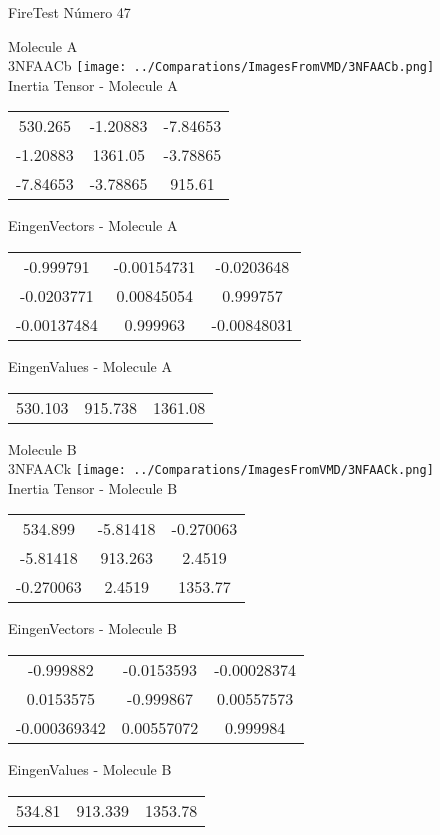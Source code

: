 \vtab[-2cm]
\begin{center}
{\large FireTest \tab Número 47}
\end{center}
\begin{multicols}{2}
\begin{center}

Molecule A \\ 
3NFAACb
\texttt{[image: ../Comparations/ImagesFromVMD/3NFAACb.png]}
\\
Inertia Tensor - Molecule A \\
\vtab

\begin{tabular}{|c c c|}
530.265	 & 	-1.20883	 & 	-7.84653	 \\
-1.20883	 & 	1361.05	 & 	-3.78865	 \\
-7.84653	 & 	-3.78865	 & 	915.61
\end{tabular}

\vtab
 EingenVectors - Molecule A     \\
\vtab
\begin{tabular}{|c c c|}
-0.999791	 & 	-0.00154731	 & 	-0.0203648	 \\
-0.0203771	 & 	0.00845054	 & 	0.999757	 \\
-0.00137484	 & 	0.999963	 & 	-0.00848031
\end{tabular}

\vtab
 EingenValues - Molecule A     \\
\vtab
\begin{tabular}{|c c c|}
530.103	 & 	915.738	 & 	1361.08	 \\
\end{tabular}
\columnbreak

Molecule B \\ 
3NFAACk
\texttt{[image: ../Comparations/ImagesFromVMD/3NFAACk.png]}
\\
Inertia Tensor - Molecule B \\
\vtab

\begin{tabular}{|c c c|}
534.899	 & 	-5.81418	 & 	-0.270063	 \\
-5.81418	 & 	913.263	 & 	2.4519	 \\
-0.270063	 & 	2.4519	 & 	1353.77
\end{tabular}

\vtab
 EingenVectors - Molecule B     \\
\vtab
\begin{tabular}{|c c c|}
-0.999882	 & 	-0.0153593	 & 	-0.00028374	 \\
0.0153575	 & 	-0.999867	 & 	0.00557573	 \\
-0.000369342	 & 	0.00557072	 & 	0.999984
\end{tabular}

\vtab
 EingenValues - Molecule B     \\
\vtab
\begin{tabular}{|c c c|}
534.81	 & 	913.339	 & 	1353.78	 \\
\end{tabular}

\end{center}
\end{multicols}
